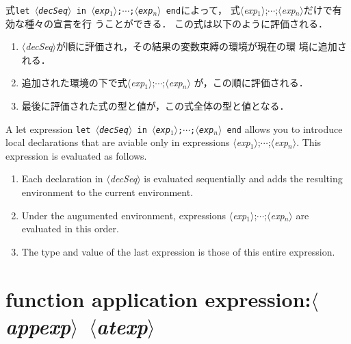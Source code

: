 \documentclass{jbook}
\newcommand{\txt}[2]{#2}
\newcommand{\nonterm}[1]{\mbox{$\langle$}{\it #1}\mbox{$\rangle$}}
\newcommand{\term}[1]{\mbox{{\tt #1}}}
\begin{document}
\ifjp%
	式\term{let\ \nonterm{decSeq}\ in\
\nonterm{exp$_1$};$\cdots$;\nonterm{exp$_n$} end}によって，
式\nonterm{exp$_1$};$\cdots$;\nonterm{exp$_n$}だけで有効な種々の宣言を行
うことができる．
	この式は以下のように評価される．
\begin{enumerate}
\item \nonterm{decSeq}が順に評価され，その結果の変数束縛の環境が現在の環
境に追加される．
\item 追加された環境の下で式\nonterm{exp$_1$};$\cdots$;\nonterm{exp$_n$}
が，この順に評価される．
\item 最後に評価された式の型と値が，この式全体の型と値となる．
\end{enumerate}
\else%
	A let expression
\term{let\ \nonterm{decSeq}\ in\
\nonterm{exp$_1$};$\cdots$;\nonterm{exp$_n$} end}
allows you to introduce local declarations that
are aviable only in expressions
\nonterm{exp$_1$};$\cdots$;\nonterm{exp$_n$}.
	This expression is evaluated as follows.
\begin{enumerate}
\item Each declaration in \nonterm{decSeq} is evaluated sequentially
and adds the resulting environment to the current environment.
\item Under the augumented environment, expressions
\nonterm{exp$_1$};$\cdots$;\nonterm{exp$_n$} are evaluated in
this order.
\item The type and value of the last expression is those of this
entire expression.
\end{enumerate}
\fi%

\section{\txt{関数適応式}{function application expression}:\nonterm{appexp}\ \nonterm{atexp}}
\end{document}
